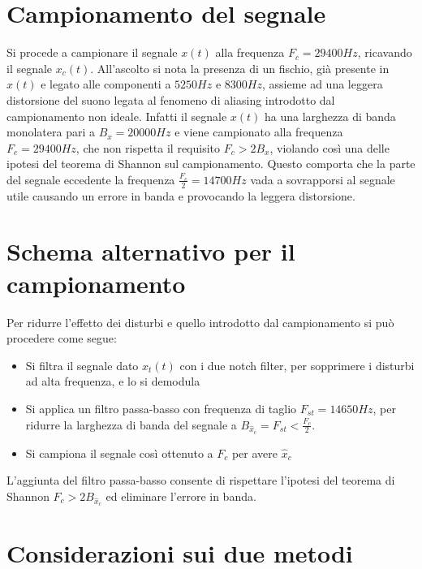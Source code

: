 \documentclass[12pt]{article}
\begin{document}
\section{Campionamento del segnale}

Si procede a campionare il segnale $x(t)$ alla frequenza $F_{c} = 29400Hz$, ricavando il segnale $x_{c}(t)$. All'ascolto si nota la presenza di un fischio, già presente in $x(t)$ e legato alle componenti a $5250Hz$ e $8300Hz$, assieme ad una leggera distorsione del suono legata al fenomeno di aliasing introdotto dal campionamento non ideale. Infatti il segnale $x(t)$ ha una larghezza di banda monolatera pari a $B_{x} = 20000Hz$ e viene campionato alla frequenza $F_{c} = 29400Hz$, che non rispetta il requisito $F_{c} > 2B_{x}$, violando così una delle ipotesi del teorema di Shannon sul campionamento. Questo comporta che la parte del segnale eccedente la frequenza $\frac{F_{c}}{2} = 14700Hz$ vada a sovrapporsi al segnale utile causando un errore in banda e provocando la leggera distorsione.

\section{Schema alternativo per il campionamento}

Per ridurre l'effetto dei disturbi e quello introdotto dal campionamento si può procedere come segue: 
\begin{itemize}
	\item Si filtra il segnale dato $x_{t}(t)$ con i due notch filter, per sopprimere i disturbi ad alta frequenza, e lo si demodula 
	\item Si applica un filtro passa-basso con frequenza di taglio $F_{st} = 14650Hz$, per ridurre la larghezza di banda del segnale a $B_{\hat{x}_{c}} = F_{st} < \frac{F_{c}}{2}$.  
	\item Si campiona il segnale così ottenuto a $F_{c}$ per avere $\hat{x}_{c}$
\end{itemize}

L'aggiunta del filtro passa-basso consente di rispettare l'ipotesi del teorema di Shannon $F_{c} > 2 B_{\hat{x}_{c}}$ ed eliminare l'errore in banda.

\section{Considerazioni sui due metodi}
\end{document}
